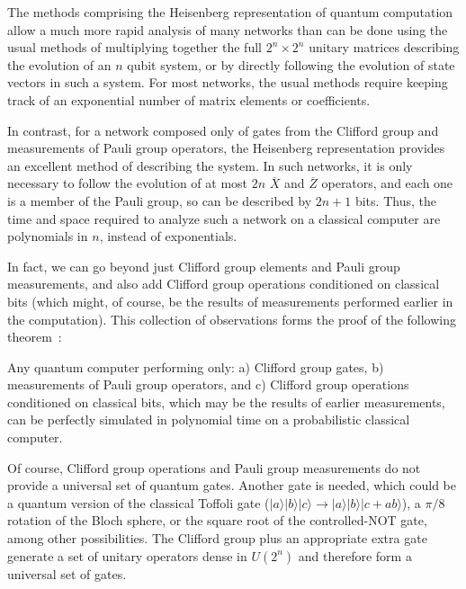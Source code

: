 The methods comprising the Heisenberg representation of quantum
computation allow a much more rapid analysis of many networks than can
be done using the usual methods of multiplying together the full $2^n
\times 2^n$ unitary matrices describing the evolution of an $n$ qubit
system, or by directly following the evolution of state vectors in
such a system.  For most networks, the usual methods require keeping
track of an exponential number of matrix elements or coefficients.

In contrast, for a network composed only of gates from the Clifford
group and measurements of Pauli group operators, the Heisenberg
representation provides an excellent method of describing the system.
In such networks, it is only necessary to follow the evolution of at
most $2n$ $\overline{X}$ and $\overline{Z}$ operators, and each one is
a member of the Pauli group, so can be described by $2n + 1$ bits.
Thus, the time and space required to analyze such a network on a
classical computer are polynomials in $n$, instead of exponentials.

In fact, we can go beyond just Clifford group elements and Pauli group
measurements, and also add Clifford group operations conditioned on
classical bits (which might, of course, be the results of measurements
performed earlier in the computation).  This collection of
observations forms the proof of the following
theorem~\cite{knillsthm}:

\begin{theorem}
Any quantum computer performing only: a) Clifford group gates, b)
measurements of Pauli group operators, and c) Clifford group operations
conditioned on classical bits, which may be the results of earlier
measurements, can be perfectly simulated in polynomial time on a
probabilistic classical computer.
\end{theorem}

Of course, Clifford group operations and Pauli group measurements do
not provide a universal set of quantum gates.  Another gate is needed,
which could be a quantum version of the classical Toffoli gate
($|a\rangle|b\rangle|c\rangle \rightarrow |a\rangle|b\rangle|c +
ab\rangle$), a $\pi/8$ rotation of the Bloch sphere, or the square
root of the controlled-NOT gate, among other possibilities.  The
Clifford group plus an appropriate extra gate generate a set of
unitary operators dense in $U(2^n)$ and therefore form a universal set
of gates.

